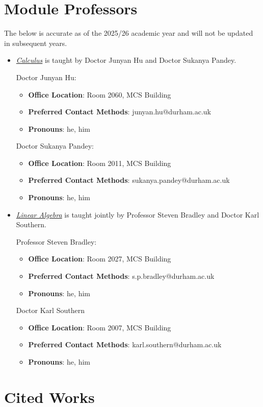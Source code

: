 \documentclass{article}
\newcommand{\separate}[1] {\vspace{#1 pt}\noindent}
\begin{document}
\section{Module Professors}

The below is accurate as of the 2025/26 academic year and will not be updated in subsequent years.
\begin{itemize}
    \item \hyperref[part:1.calc]{\textit{Calculus}} is taught by Doctor Junyan Hu and Doctor Sukanya Pandey.
        
    \separate{3}Doctor Junyan Hu:
    \begin{itemize}
        \item \textbf{Office Location}: Room 2060, MCS Building
        \item \textbf{Preferred Contact Methods}: junyan.hu@durham.ac.uk
        \item \textbf{Pronouns}: he, him
    \end{itemize}
        Doctor Sukanya Pandey:
    \begin{itemize}
        \item \textbf{Office Location}: Room 2011, MCS Building
        \item \textbf{Preferred Contact Methods}: sukanya.pandey@durham.ac.uk
        \item \textbf{Pronouns}: he, him
    \end{itemize}

    \item \hyperref[part:2.la]{\textit{Linear Algebra}} is taught jointly by Professor Steven Bradley and Doctor Karl Southern.
    
    \separate{3}Professor Steven Bradley:
    \begin{itemize}
        \item \textbf{Office Location}: Room 2027, MCS Building
        \item \textbf{Preferred Contact Methods}: s.p.bradley@durham.ac.uk
        \item \textbf{Pronouns}: he, him
    \end{itemize}
    Doctor Karl Southern
    \begin{itemize}
        \item \textbf{Office Location}: Room 2007, MCS Building
        \item \textbf{Preferred Contact Methods}: karl.southern@durham.ac.uk
        \item \textbf{Pronouns}: he, him
    \end{itemize}
\end{itemize}

\section{Cited Works}
\end{document}
